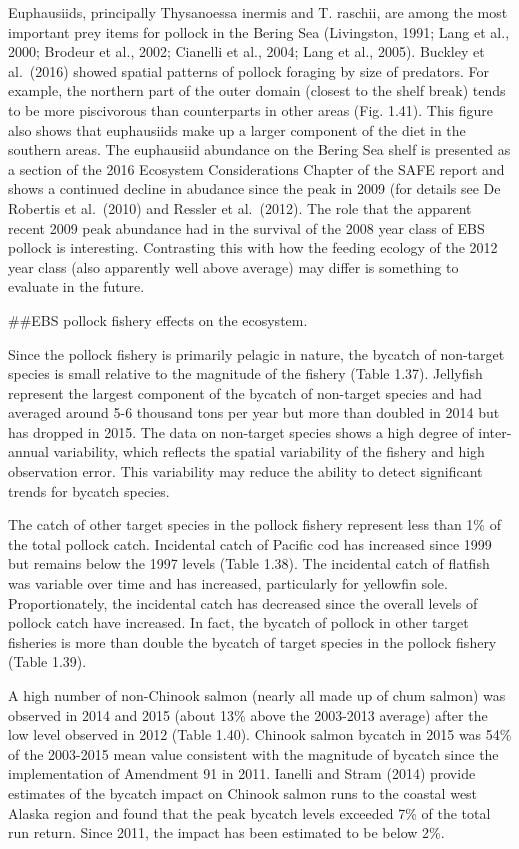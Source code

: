 Euphausiids, principally Thysanoessa inermis and T. raschii, are among
the most important prey items for pollock in the Bering Sea (Livingston,
1991; Lang et al., 2000; Brodeur et al., 2002; Cianelli et al., 2004;
Lang et al., 2005). Buckley et al.~(2016) showed spatial patterns of
pollock foraging by size of predators. For example, the northern part of
the outer domain (closest to the shelf break) tends to be more
piscivorous than counterparts in other areas (Fig. 1.41). This figure
also shows that euphausiids make up a larger component of the diet in
the southern areas. The euphausiid abundance on the Bering Sea shelf is
presented as a section of the 2016 Ecosystem Considerations Chapter of
the SAFE report and shows a continued decline in abudance since the peak
in 2009 (for details see De Robertis et al.~(2010) and Ressler et
al.~(2012). The role that the apparent recent 2009 peak abundance had in
the survival of the 2008 year class of EBS pollock is interesting.
Contrasting this with how the feeding ecology of the 2012 year class
(also apparently well above average) may differ is something to evaluate
in the future.

\#\#EBS pollock fishery effects on the ecosystem.

Since the pollock fishery is primarily pelagic in nature, the bycatch of
non-target species is small relative to the magnitude of the fishery
(Table 1.37). Jellyfish represent the largest component of the bycatch
of non-target species and had averaged around 5-6 thousand tons per year
but more than doubled in 2014 but has dropped in 2015. The data on
non-target species shows a high degree of inter-annual variability,
which reflects the spatial variability of the fishery and high
observation error. This variability may reduce the ability to detect
significant trends for bycatch species.

The catch of other target species in the pollock fishery represent less
than 1\% of the total pollock catch. Incidental catch of Pacific cod has
increased since 1999 but remains below the 1997 levels (Table 1.38). The
incidental catch of flatfish was variable over time and has increased,
particularly for yellowfin sole. Proportionately, the incidental catch
has decreased since the overall levels of pollock catch have increased.
In fact, the bycatch of pollock in other target fisheries is more than
double the bycatch of target species in the pollock fishery (Table
1.39).

A high number of non-Chinook salmon (nearly all made up of chum salmon)
was observed in 2014 and 2015 (about 13\% above the 2003-2013 average)
after the low level observed in 2012 (Table 1.40). Chinook salmon
bycatch in 2015 was 54\% of the 2003-2015 mean value consistent with the
magnitude of bycatch since the implementation of Amendment 91 in 2011.
Ianelli and Stram (2014) provide estimates of the bycatch impact on
Chinook salmon runs to the coastal west Alaska region and found that the
peak bycatch levels exceeded 7\% of the total run return. Since 2011,
the impact has been estimated to be below 2\%.

